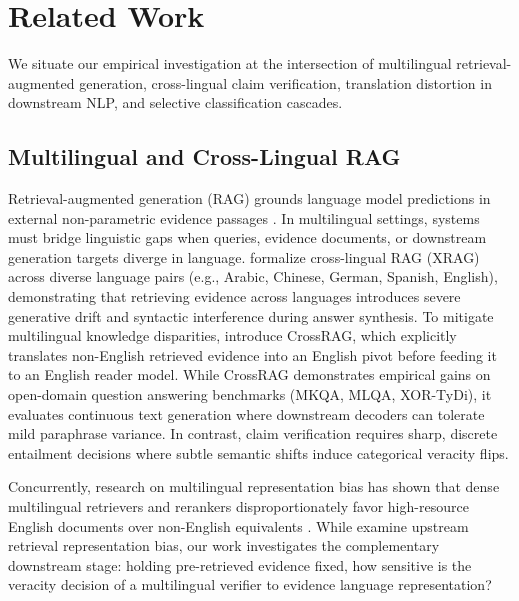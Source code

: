 \section{Related Work}
\label{sec:related_work}

We situate our empirical investigation at the intersection of multilingual retrieval-augmented generation, cross-lingual claim verification, translation distortion in downstream NLP, and selective classification cascades.

\subsection{Multilingual and Cross-Lingual RAG}
Retrieval-augmented generation (RAG) grounds language model predictions in external non-parametric evidence passages \citep{lewis-etal-2020-rag}. In multilingual settings, systems must bridge linguistic gaps when queries, evidence documents, or downstream generation targets diverge in language. \citet{liu-etal-2025-xrag} formalize cross-lingual RAG (XRAG) across diverse language pairs (e.g., Arabic, Chinese, German, Spanish, English), demonstrating that retrieving evidence across languages introduces severe generative drift and syntactic interference during answer synthesis. To mitigate multilingual knowledge disparities, \citet{ranaldi-etal-2026-multilingual} introduce CrossRAG, which explicitly translates non-English retrieved evidence into an English pivot before feeding it to an English reader model. While CrossRAG demonstrates empirical gains on open-domain question answering benchmarks (MKQA, MLQA, XOR-TyDi), it evaluates continuous text generation where downstream decoders can tolerate mild paraphrase variance. In contrast, claim verification requires sharp, discrete entailment decisions where subtle semantic shifts induce categorical veracity flips.

Concurrently, research on multilingual representation bias has shown that dense multilingual retrievers and rerankers disproportionately favor high-resource English documents over non-English equivalents \citep{wang-etal-2026-languages,conneau-etal-2020-unsupervised}. While \citet{wang-etal-2026-languages} examine upstream retrieval representation bias, our work investigates the complementary downstream stage: holding pre-retrieved evidence fixed, how sensitive is the veracity decision of a multilingual verifier to evidence language representation?

